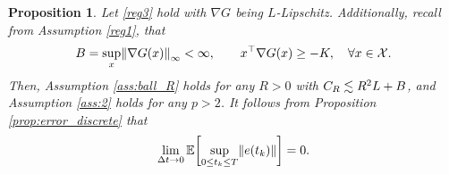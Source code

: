 \documentclass[11pt, twoside]{report}
\newtheorem{proposition}[theorem]{Proposition}
\begin{document}
\begin{proposition}\label{prop:error_discrete_part2}
Let \ref{reg3} hold with  $\nabla G$ being $L$-Lipschitz. Additionally, recall from Assumption \ref{reg1}, that $$\cinfty=\sup_{x} \norm{\nabla G(x)}_\infty<\infty,\qquad x^\top \nabla G(x) \ge -\ccc, \quad \forall x\in \mathcal X.$$ 
Then, Assumption \ref{ass:ball_R} holds for any $R>0$ with $C_R \lesssim R^2 L + B$, and Assumption \ref{ass:2} holds for any $p>2$.
It follows from Proposition \ref{prop:error_discrete} that 
$$
\lim_{\deltat \to 0} \EE\bp{\sup_{0\leq t_k \leq T} \norm{e(t_k)}} = 0.
$$
\end{proposition}
\end{document}
